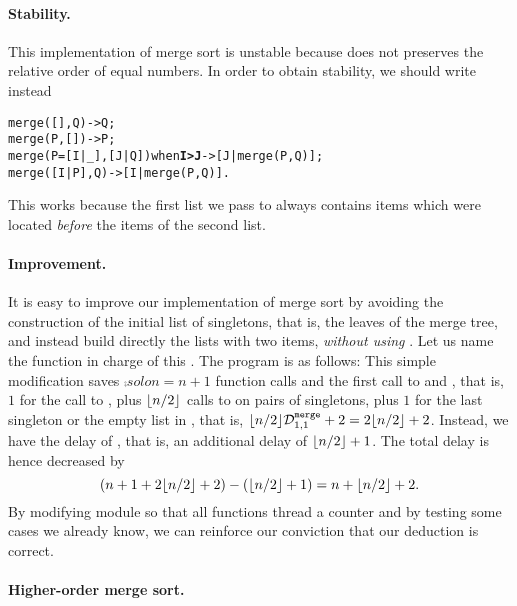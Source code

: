 \paragraph{Stability.}

This implementation of merge sort is unstable because
 does not preserves the relative order of equal
numbers. In order to obtain stability, we should write instead
\begin{alltt}
merge(   [],      Q)            -> Q;
merge(    P,     [])            -> P;
merge(P=[I|_],[J|Q]) when \textbf{I > J} -> [J|merge(P,Q)];\hfill% \emph{Here}
merge(  [I|P],    Q)            -> [I|merge(P,Q)].
\end{alltt}
This works because the first list we pass to  always
contains items which were located \emph{before} the items of the
second list.

\medskip

\paragraph{Improvement.}

It is easy to improve our implementation of merge sort by avoiding the
construction of the initial list of singletons, that is, the leaves of
the merge tree, and instead build directly the lists with two items,
\emph{without using }. Let us name the function in
charge of this . The program is as follows:
 This simple modification saves
\(\comp{solo}{n} = n+1\) function calls and the first call to
 and , that is, \(1\) for the call to
, plus \(\floor{n/2}\) calls to  on
pairs of singletons, plus \(1\) for the last singleton or the empty
list in , that is, \(\floor{n/2}\comp{merge}{1,1} + 2
= 2 \floor{n/2} + 2\). Instead, we have the delay of ,
that is, an additional delay of \(\floor{n/2} + 1\). The total delay
is hence decreased by
\[
(n + 1 + 2\floor{n/2} + 2) - (\floor{n/2} + 1) = n + \floor{n/2} + 2.
\]
By modifying module  so that all functions thread a
counter and by testing some cases we already know, we can reinforce
our conviction that our deduction is correct.

\medskip

\paragraph{Higher\hyp{}order merge sort.}

